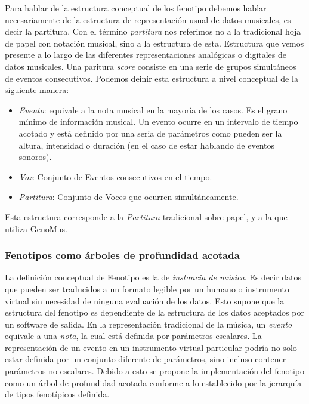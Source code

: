 Para hablar de la estructura conceptual de los fenotipo debemos hablar necesariamente de la estructura de representación usual de datos musicales, es decir la partitura. Con el término \textit{partitura} nos referimos no a la tradicional hoja de papel con notación musical, sino a la estructura de esta. Estructura que vemos presente a lo largo de las diferentes representaciones analógicas o digitales de datos musicales. Una paritura \textit{score} consiste en una serie de grupos simultáneos de eventos consecutivos. Podemos deinir esta estructura a nivel conceptual de la siguiente manera:

\begin{itemize}
    \item \textit{Evento}: equivale a la nota musical en la mayoría de los casos. Es el grano mínimo de información musical. Un evento ocurre en un intervalo de tiempo acotado y está definido por una seria de parámetros como pueden ser la altura, intensidad o duración (en el caso de estar hablando de eventos sonoros).
    
    \item \textit{Voz}: Conjunto de Eventos consecutivos en el tiempo.
    
    \item \textit{Partitura}: Conjunto de Voces que ocurren simultáneamente.
\end{itemize}

Esta estructura corresponde a la \textit{Partitura} tradicional sobre papel, y a la que utiliza GenoMus.

\subsubsection{Fenotipos como árboles de profundidad acotada}

La definición conceptual de Fenotipo es la de \textit{instancia de música}. Es decir datos que pueden ser traducidos a un formato legible por un humano o instrumento virtual sin necesidad de ninguna evaluación de los datos. Esto supone que la estructura del fenotipo es dependiente de la estructura de los datos aceptados por un software de salida. En la representación tradicional de la música, un \textit{evento} equivale a una \textit{nota}, la cual está definida por parámetros escalares. La representación de un evento en un instrumento virtual particular podría no solo estar definida por un conjunto diferente de parámetros, sino incluso contener parámetros no escalares. Debido a esto se propone la implementación del fenotipo como un árbol de profundidad acotada conforme a lo establecido por la jerarquía de tipos fenotípicos definida.

